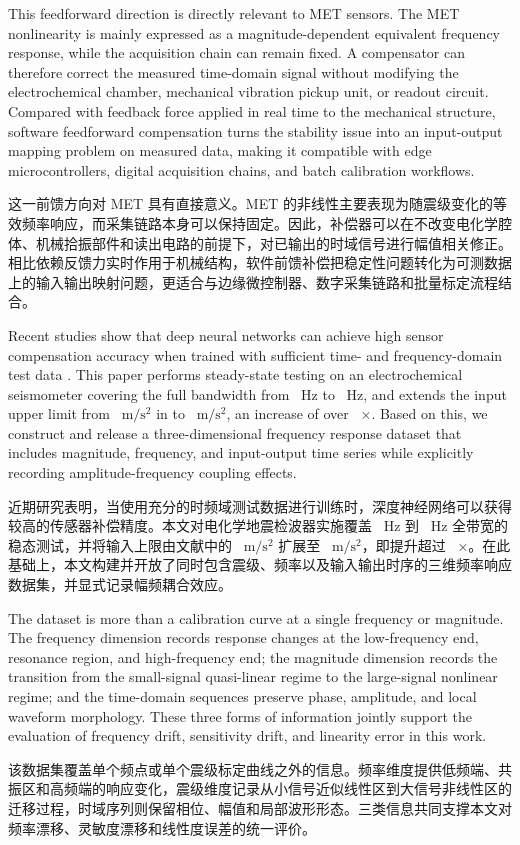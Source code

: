 \documentclass[sn-nature]{sn-jnl}
\newif\ifCNENEnglish
\newif\ifCNENBilingual
\newcommand{\CNEN}[2]{%
    \ifCNENBilingual
        #1%
        \if\relax\detokenize{#2}\relax\else\par #2\fi%
    \else
        \ifCNENEnglish
            #2%
        \else
            #1%
        \fi
    \fi
}
\begin{document}
\CNEN{这一前馈方向对 MET 具有直接意义。MET 的非线性主要表现为随震级变化的等效频率响应，而采集链路本身可以保持固定。因此，补偿器可以在不改变电化学腔体、机械拾振部件和读出电路的前提下，对已输出的时域信号进行幅值相关修正。相比依赖反馈力实时作用于机械结构，软件前馈补偿把稳定性问题转化为可测数据上的输入输出映射问题，更适合与边缘微控制器、数字采集链路和批量标定流程结合。}{This feedforward direction is directly relevant to MET sensors. The MET nonlinearity is mainly expressed as a magnitude-dependent equivalent frequency response, while the acquisition chain can remain fixed. A compensator can therefore correct the measured time-domain signal without modifying the electrochemical chamber, mechanical vibration pickup unit, or readout circuit. Compared with feedback force applied in real time to the mechanical structure, software feedforward compensation turns the stability issue into an input-output mapping problem on measured data, making it compatible with edge microcontrollers, digital acquisition chains, and batch calibration workflows.}

\CNEN{近期研究表明，当使用充分的时频域测试数据进行训练时，深度神经网络可以获得较高的传感器补偿精度\cite{HOFLER2024136528}。本文对电化学地震检波器实施覆盖 \valFreqScanStart~Hz 到 \valFreqScanEnd~Hz 全带宽的稳态测试，并将输入上限由文献\cite{WOS:000408118700046}中的 \valSunForceAcc~$\text{m}/\text{s}^2$ 扩展至 \valMagScanEnd~$\text{m}/\text{s}^2$，即提升超过 \valInputGainExpansion~$\times$。在此基础上，本文构建并开放了同时包含震级、频率以及输入输出时序的三维频率响应数据集，并显式记录幅频耦合效应。}{Recent studies show that deep neural networks can achieve high sensor compensation accuracy when trained with sufficient time- and frequency-domain test data \cite{HOFLER2024136528}. This paper performs steady-state testing on an electrochemical seismometer covering the full bandwidth from \valFreqScanStart~Hz to \valFreqScanEnd~Hz, and extends the input upper limit from \valSunForceAcc~$\text{m}/\text{s}^2$ in \cite{WOS:000408118700046} to \valMagScanEnd~$\text{m}/\text{s}^2$, an increase of over \valInputGainExpansion~$\times$. Based on this, we construct and release a three-dimensional frequency response dataset that includes magnitude, frequency, and input-output time series while explicitly recording amplitude-frequency coupling effects.%
}

\CNEN{该数据集覆盖单个频点或单个震级标定曲线之外的信息。频率维度提供低频端、共振区和高频端的响应变化，震级维度记录从小信号近似线性区到大信号非线性区的迁移过程，时域序列则保留相位、幅值和局部波形形态。三类信息共同支撑本文对频率漂移、灵敏度漂移和线性度误差的统一评价。}{The dataset is more than a calibration curve at a single frequency or magnitude. The frequency dimension records response changes at the low-frequency end, resonance region, and high-frequency end; the magnitude dimension records the transition from the small-signal quasi-linear regime to the large-signal nonlinear regime; and the time-domain sequences preserve phase, amplitude, and local waveform morphology. These three forms of information jointly support the evaluation of frequency drift, sensitivity drift, and linearity error in this work.}
\end{document}
